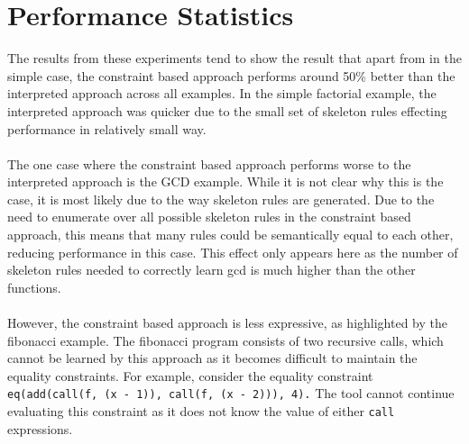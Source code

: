 \section{Performance Statistics}
The results from these experiments tend to show the result that apart from in the simple case, the constraint based approach performs around 50\% better than the interpreted approach across all examples. In the simple factorial example, the interpreted approach was quicker due to the small set of skeleton rules effecting performance in relatively small way. \\ \\
The one case where the constraint based approach performs worse to the interpreted approach is the GCD example. While it is not clear why this is the case, it is most likely due to the way skeleton rules are generated. Due to the need to enumerate over all possible skeleton rules in the constraint based approach, this means that many rules could be semantically equal to each other, reducing performance in this case. This effect only appears here as the number of skeleton rules needed to correctly learn gcd is much higher than the other functions. \\ \\
However, the constraint based approach is less expressive, as highlighted by the fibonacci example. The fibonacci program consists of two recursive calls, which cannot be learned by this approach as it becomes difficult to maintain the equality constraints. For example, consider the equality constraint \lstinline{eq(add(call(f, (x - 1)), call(f, (x - 2))), 4).} The tool cannot continue evaluating this constraint as it does not know the value of either \lstinline{call} expressions.%

